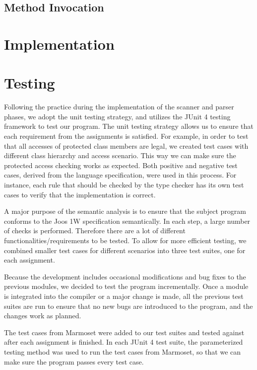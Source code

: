 \documentclass[a4paper, notitlepage]{report}
\begin{document}
\section{Method Invocation}
\label{method_invoke}





\clearpage
\chapter{Implementation}
\label{implementation}





\chapter{Testing}
\label{testing}
Following the practice during the implementation of the scanner and parser phases, we adopt the unit testing strategy, and utilizes the JUnit 4 testing framework to test our program. The unit testing strategy allows us to ensure that each requirement from the assignments is satisfied. For example, in order to test that all accesses of protected class members are legal, we created test cases with different class hierarchy and access scenario. This way we can make sure the protected access checking works as expected. Both positive and negative test cases, derived from the language specification, were used in this process. For instance, each rule that should be checked by the type checker has its own test cases to verify that the implementation is correct.

A major purpose of the semantic analysis is to ensure that the subject program conforms to the Joos 1W specification semantically. In each step, a large number of checks is performed. Therefore there are a lot of different functionalities/requirements to be tested. To allow for more efficient testing, we combined smaller test cases for different scenarios into three test suites, one for each assignment.

Because the development includes occasional modifications and bug fixes to the previous modules, we decided to test the program incrementally. Once a module is integrated into the compiler or a major change is made, all the previous test suites are run to ensure that no new bugs are introduced to the program, and the changes work as planned.

The test cases from Marmoset were added to our test suites and tested against after each assignment is finished. In each JUnit 4 test suite, the parameterized testing method was used to run the test cases from Marmoset, so that we can make sure the program passes every test case. 
\end{document}

